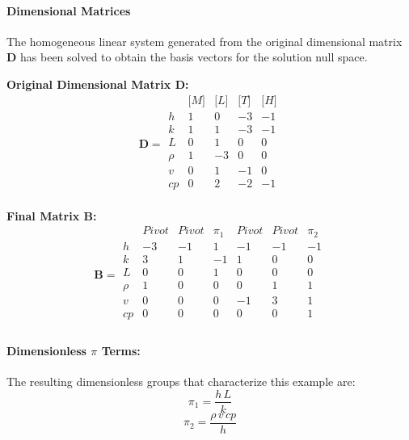                 \paragraph{Dimensional Matrices}
                The homogeneous linear system generated from the original dimensional matrix $\mathbf{D}$ has been solved to obtain the basis vectors for the solution null space.

                \textbf{Original Dimensional Matrix $\mathbf{D}$:}
                \[\mathbf{D} = \begin{array}{r|rrrr}
                & \text{[}M\text{]} & \text{[}L\text{]} & \text{[}T\text{]} & \text{[}H\text{]} \\
                \hline
                h & 1 & 0 & -3 & -1 \\
k & 1 & 1 & -3 & -1 \\
L & 0 & 1 & 0 & 0 \\
\rho & 1 & -3 & 0 & 0 \\
v & 0 & 1 & -1 & 0 \\
cp & 0 & 2 & -2 & -1 \\

                \end{array}\]


        \textbf{Final Matrix $\mathbf{B}$:}
        \[\mathbf{B} = \begin{array}{r|rrrrrr}
        & Pivot & Pivot & \pi_{1} & Pivot & Pivot & \pi_{2} \\
        \hline
        h & -3 & -1 & 1 & -1 & -1 & -1 \\
k & 3 & 1 & -1 & 1 & 0 & 0 \\
L & 0 & 0 & 1 & 0 & 0 & 0 \\
\rho & 1 & 0 & 0 & 0 & 1 & 1 \\
v & 0 & 0 & 0 & -1 & 3 & 1 \\
cp & 0 & 0 & 0 & 0 & 0 & 1 \\

        \end{array}\]

        \paragraph{Dimensionless $\pi$ Terms: }
        The resulting dimensionless groups that characterize this example are:
\begin{equation}
\pi_{1} = \frac{h \, L}{k}
\end{equation}
\begin{equation}
\pi_{2} = \frac{\rho \, v \, cp}{h}
\end{equation}

